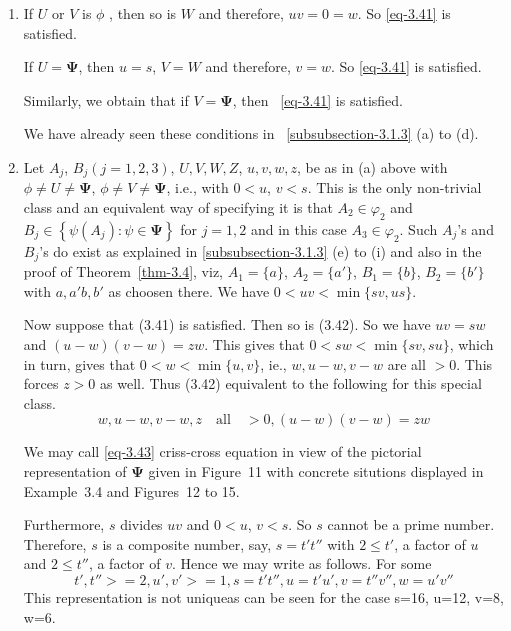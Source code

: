 \documentclass[a4paper,12pt]{article}
\theoremstyle{definition}
\theoremstyle{underlinethm}
\theoremstyle{definition}
\begin{document}
\begin{enumerate}[label=(\alph*)]
\item  If $U$ or $V$ is $\phi$ , then so is $W$ and therefore, $uv=0 =w$. So \eqref{eq-3.41} is satisfied.

If $U = \boldsymbol{\Psi}$, then $u=s$, $V=W$ and therefore, $v=w$. So \eqref{eq-3.41} is satisfied.

Similarly, we obtain that if $V = \boldsymbol{\Psi}$, then ~\eqref{eq-3.41} is satisfied.

We have already seen these conditions in ~\eqref{subsubsection-3.1.3} (a) to (d).

\item Let $A_{j}$, $B_{j} (j=1,2,3)$, $U,V,W,Z$, $u,v,w,z$, be as in (a) above with $\phi \neq U \neq \boldsymbol{\Psi}$, $\phi \neq V \neq \boldsymbol{\Psi}$, i.e., with $0 < u$, $v < s$. This is the only non-trivial class and an equivalent way of specifying it is that $A_{2} \in \varphi_{2}$ and $B_{j} \in \left\{\psi(A_{j}) : \psi \in \boldsymbol{\Psi}\right\}$ for $j=1,2$ and in this case $A_{3} \in \varphi_{2}$. Such $A_{j}$'s and $B_{j}$'s do exist as explained in \eqref{subsubsection-3.1.3} (e) to (i) and also in the proof of Theorem~\eqref{thm-3.4}, viz, $A_{1} = \{a\}$, $A_{2} = \{a'\}$, $B_{1} = \{b\}$, $B_{2} = \{b'\}$ with $a, a' b, b'$ as choosen there. We have $0< uv < \min \{sv, us\}$. 

Now suppose that (3.41) is satisfied. Then so is (3.42). So we have $uv=sw$ and $(u-w)(v-w) =zw$. This gives that $0< sw < \min \{sv, su\}$, which in turn, gives that $0 < w < \min\{ u,v\}$, ie., $w, u-w, v-w$ are all $> 0$. This forces $z>0$ as well. Thus (3.42) equivalent to the following for this special class.
\begin{equation}
w, u-w, v-w, z\quad \text{all}\quad  > 0, (u-w)(v-w) =zw \tag{3.43}\label{eq-3.43}
\end{equation} 

We may call \eqref{eq-3.43} criss-cross equation in view of the pictorial representation of $\boldsymbol{\Psi}$ given in Figure~11 with concrete situtions displayed in Example~3.4 and Figures~12 to 15.

Furthermore, $s$ divides $uv$ and $0 < u$, $v < s$. So $s$ cannot be a prime number. Therefore, $s$ is a composite number, say, $s = t' t''$ with $2 \leq t'$, a factor of $u$ and $2 \leq t''$, a factor of $v$. Hence we may write as follows. 
For some 
\begin{equation}
t', t''>=2, u', v' >=1, s=t't'', u=t'u', v=t''v'', w=u'v''\tag{3.44}\label{eq-3.44}
\end{equation}
This representation is not uniqueas can be seen for the case s=16, u=12, v=8, w=6.




\end{enumerate}
\end{document}
